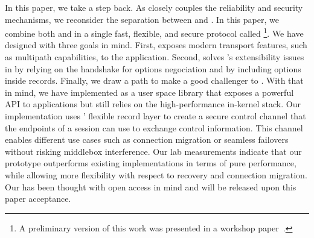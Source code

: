 In this paper, we take a step back. As \quic closely couples the reliability and security mechanisms, we reconsider the separation between \tcp and \tls.
In this paper, we combine both \tcp and  in a single fast, flexible, and secure protocol called \textbf{\tcpls}\footnote{A preliminary version of this work was presented in a workshop paper~\cite{rochet2020tcpls}.}. We have designed \tcpls with three goals in mind. First, \tcpls exposes modern transport features, such as multipath capabilities, to the application. Second, \tcpls solves \tcp's extensibility issues in \tcp by relying on the \tls handshake for \tcp options negociation and by including \tcp options inside \tls records. 
Finally, we draw a path to make \tcpls a good challenger to \quic.
With that in mind, we have implemented \tcpls as a user space library that exposes a powerful API to applications but still relies on the high-performance in-kernel \tcp stack. Our implementation uses \tls' flexible record layer to create a secure control channel that the endpoints of a \tcpls session can use to exchange control information. This channel enables different use cases such as connection migration or seamless failovers without risking middlebox interference. Our lab measurements indicate that our \tcpls prototype outperforms existing \quic implementations in terms of pure performance, while allowing more flexibility with respect to recovery and connection migration. Our \tcpls has been thought with open access in mind and will be released upon this paper acceptance.

